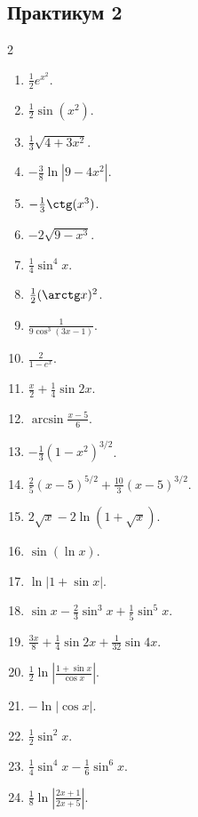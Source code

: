 \subsection*{Практикум 2}
\begin{multicols}{2}
\begin{enumerate}
\item $\frac{1}{2}e^{x^2}$.
\item $\frac{1}{2}\sin(x^2)$.
\item $\frac{1}{3}\sqrt{4+3x^2}$.
\item $-\frac{3}{8}\ln|9-4x^2|$.
\item $-\frac{1}{3}\ctg(x^3)$.
\item $-2\sqrt{9-x^3}$.
\item $\frac{1}{4}\sin^{4}x$.
\item $\frac{1}{2}(\arctg x)^2$.
\item $\frac{1}{9\cos^{3}(3x-1)}$.
\item $\frac{2}{1-e^x}$.
\item $\frac{x}{2}+\frac{1}{4}\sin2x$.
\item $\arcsin\frac{x-5}{6}$.
\item $-\frac{1}{3}(1-x^2)^{3/2}$.
\item $\frac{2}{5}(x-5)^{5/2}+\frac{10}{3}(x-5)^{3/2}$.
\item $2\sqrt{x}-2\ln(1+\sqrt{x})$.
\item $\sin(\ln x)$.
\item $\ln|1+\sin x|$.
\item $\sin x-\frac{2}{3}\sin^{3}x+\frac{1}{5}\sin^{5}x$.
\item $\frac{3x}{8}+\frac{1}{4}\sin2x+\frac{1}{32}\sin4x$.
\item $\frac{1}{2}\ln\left|\frac{1+\sin x}{\cos x}\right|$.
\item $-\ln|\cos x|$.
\item $\frac{1}{2}\sin^{2}x$.
\item $\frac{1}{4}\sin^{4}x-\frac{1}{6}\sin^{6}x$.
\item $\frac{1}{8}\ln\left|\frac{2x+1}{2x+5}\right|$.
\end{enumerate}
\end{multicols}
\clearpage
